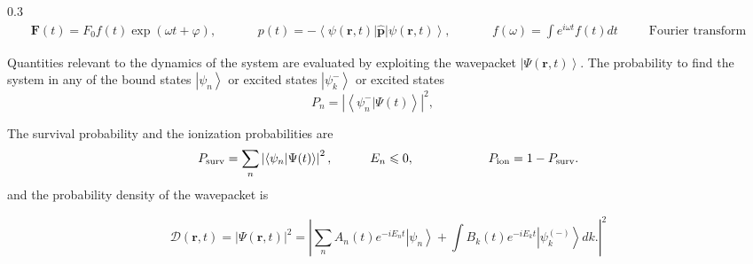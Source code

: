 \documentclass[12pt]{beamer}
\begin{document}
\begin{frame}
\begin{textblock*}{0.3\textwidth}
{\footnotesize
\begin{align}
\boldsymbol{F}(t) = F_0 f(t) \exp( \omega t + \varphi),
\hspace{40pt}
p(t) = - \left\langle \psi(\boldsymbol{r},t)\right| \boldsymbol{\hat{p}}
\left| \psi(\boldsymbol{r},t)\right\rangle, \nonumber
\hspace{40pt}
f(\omega) = \int e^{i\omega t} f(t) dt\hspace{30pt}\mbox{Fourier transform}
\end{align}
}


{\normalsize
{\normalsize 
\noindent Quantities relevant to the dynamics of the system are 
evaluated by exploiting the wavepacket 
$\left| \Psi(\boldsymbol{r},t)\right\rangle$}. 
The probability to find the system in any 
of the bound states $\left| \psi_n \right\rangle$ 
or excited states   $\left| \psi_k^-\right\rangle$ or excited states  
\begin{equation}
P_n = \left| \left\langle \psi_n^-
  | \Psi(t)\right\rangle\right|^2,
 \hspace{30pt}
 \nonumber
\end{equation}
}


{
\normalsize 
\noindent The survival probability and the ionization probabilities are 
\begin{equation}
P_{\rm surv} = \sum_n \left| \left\langle \psi_n
  | \Psi(t)\right\rangle\right|^2, 
 \hspace{30pt} E_n \leqslant 0, \hspace{60pt}
P_{\rm ion} = 1- P_{\rm surv}.
 \nonumber
\end{equation}
\noindent and the probability density of the wavepacket is

\begin{equation}
 \mathcal{D}(\boldsymbol{r},t) = \left| \Psi(\boldsymbol{r},t)\right|^2
  =   \left| \sum_n A_n(t) e^{-iE_n t}\left| \psi_n \right\rangle  
  + \int B_{k}(t) e^{-iE_k t}\left| \psi_k^{(-)}\right\rangle dk.\right|^2
 \nonumber
\end{equation}
}
\end{textblock*}









\end{frame}
\end{document}
